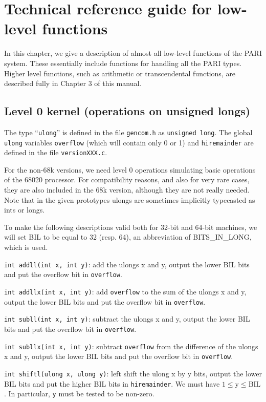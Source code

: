 \chapter{Technical reference guide for low-level functions}

In this chapter, we give a description of almost all low-level functions of
the PARI system. These essentially include functions for handling all the
PARI types. Higher level functions, such as arithmetic or transcendental
functions, are described fully in Chapter 3 of this manual.

\section{Level 0 kernel (operations on unsigned longs)}
The type ``{\tt ulong}'' is defined in the file {\tt gencom.h} as 
{\tt unsigned long}. The global {\tt ulong} variables {\tt overflow} 
(which will contain only 0 or 1) and {\tt hiremainder} are defined in the
file {\tt versionXXX.c}. 

For the non-68k versions, we need level 0 operations simulating basic
operations of the 68020 processor. For compatibility reasons, and also
for very rare cases, they are also included in the 68k version, although
they are not really needed. Note that in the given prototypes ulongs are 
sometimes implicitly typecasted as ints or longs.

To make the following descriptions valid both for 32-bit and 64-bit
machines, we will set BIL to be equal to 32 (resp. 64), an abbreviation
of BITS\_IN\_LONG, which is used.

{\tt int addll(int x, int y)}: add the ulongs x and y, output the lower BIL
bits and put the overflow bit in {\tt overflow}.

{\tt int addllx(int x, int y)}: add {\tt overflow} to the sum of the ulongs x
and y, output the lower BIL bits and put the overflow bit in {\tt overflow}.

{\tt int subll(int x, int y)}: subtract the ulongs x and y, output the lower 
BIL bits and put the overflow bit in {\tt overflow}.

{\tt int subllx(int x, int y)}: subtract {\tt overflow} from the difference
of the ulongs x and y, output the lower BIL bits and put the overflow bit in
{\tt overflow}.

{\tt int shiftl(ulong x, ulong y)}: left shift the ulong x by y bits, output
the lower BIL bits and put the higher BIL bits in {\tt hiremainder}. We must
have $1\le\text{y}\le\text{BIL}$. In particular, {\tt y} must be tested
to be non-zero.

